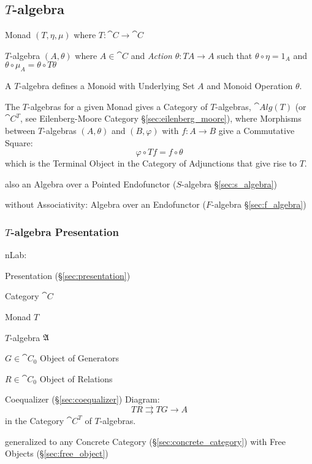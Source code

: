 \subsection{$T$-algebra}\label{sec:t_algebra}

Monad $(T, \eta, \mu)$ where $T : \cat{C} \rightarrow \cat{C}$

$T$-algebra $(A, \theta)$ where $A \in \cat{C}$ and \emph{Action}
$\theta : T A \rightarrow A$ such that $\theta \circ \eta = 1_A$ and
$\theta \circ \mu_A = \theta \circ T \theta$

A $T$-algebra defines a Monoid with Underlying Set $A$ and Monoid
Operation $\theta$.

The $T$-algebras for a given Monad gives a Category of $T$-algebras,
$\cat{Alg}(T)$ (or $\cat{C}^T$, see Eilenberg-Moore Category
\S\ref{sec:eilenberg_moore}), where Morphisms between $T$-algebras
$(A, \theta)$ and $(B, \varphi)$ with $f : A \rightarrow B$ give a
Commutative Square:
\[
  \varphi \circ T f = f \circ \theta
\]
which is the Terminal Object in the Category of Adjunctions that give
rise to $T$.

also an Algebra over a Pointed Endofunctor ($S$-algebra
\S\ref{sec:s_algebra})

without Associativity: Algebra over an Endofunctor
($F$-algebra \S\ref{sec:f_algebra})



\subsubsection{$T$-algebra Presentation}
\label{sec:t_algebra_presentation}

nLab:

Presentation (\S\ref{sec:presentation})

Category $\cat{C}$

Monad $T$

$T$-algebra $\mathfrak{A}$

$G \in \cat{C}_0$ Object of Generators

$R \in \cat{C}_0$ Object of Relations

Coequalizer (\S\ref{sec:coequalizer}) Diagram:
\[
  T R \rightrightarrows T G \rightarrow A
\]
in the Category $\cat{C}^T$ of $T$-algebras. %

generalized to any Concrete Category (\S\ref{sec:concrete_category})
with Free Objects (\S\ref{sec:free_object}) %

